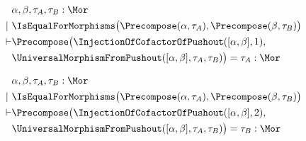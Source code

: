 \begin{sequent}
\begin{align*}
  &\alpha, \beta, \tau_A, \tau_B:\Mor \\
  |~ &\IsEqualForMorphisms\big( \Precompose( \alpha, \tau_A ), \Precompose( \beta, \tau_B) \big)\\
  \vdash &\Precompose\big( \InjectionOfCofactorOfPushout( [\alpha, \beta], 1 ), \\
  &\UniversalMorphismFromPushout( [\alpha, \beta], \tau_A, \tau_B )\big) = \tau_A: \Mor
\end{align*}
\end{sequent}

\begin{sequent}
\begin{align*}
  &\alpha, \beta, \tau_A, \tau_B:\Mor \\
  |~ &\IsEqualForMorphisms\big( \Precompose( \alpha, \tau_A ), \Precompose( \beta, \tau_B) \big)\\
  \vdash &\Precompose\big( \InjectionOfCofactorOfPushout( [\alpha, \beta], 2 ), \\
  &\UniversalMorphismFromPushout( [\alpha, \beta], \tau_A, \tau_B )\big) = \tau_B: \Mor
\end{align*}
\end{sequent}
